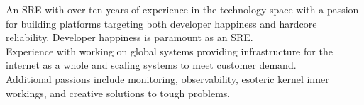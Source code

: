 \documentclass[9pt]{developercv}
\begin{document}
\vspace{0.5cm}



\begin{minipage}[t]{0.5\textwidth} %
	\vspace{-\baselineskip} %
	An SRE with over ten years of experience in the technology space
	with a passion for building platforms targeting both developer
	happiness and hardcore reliability. Developer happiness is paramount as an SRE.\\

	Experience with working on global systems providing infrastructure
	for the internet as a whole and scaling systems to meet customer demand.\\

	Additional passions include monitoring, observability, esoteric kernel
	inner workings, and creative solutions to tough problems.
\end{minipage}
\hfill %
\begin{minipage}[t]{0.2\textwidth} %
	\vspace{-\baselineskip} %
	\\
	\\
	\\
	\\
	\\
\end{minipage}
\begin{minipage}[t]{0.2\textwidth}
	\vspace{-\baselineskip} %
	\\
	\\
	\\
	\\
	\\
\end{minipage}
\end{document}
